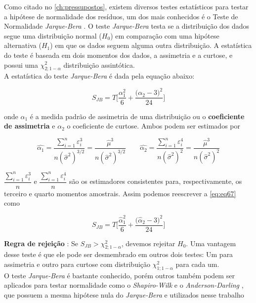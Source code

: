 \noindent Como citado no \autoref{ch:pressupostos}, existem diversos testes estatísticos para testar a hipótese de normalidade dos resíduos, um dos mais conhecidos é o Teste de Normalidade \textit{Jarque-Bera} \cite{jarque1987test}. O teste \textit{Jarque-Bera} testa se a distribuição dos dados segue uma distribuição normal ($H_{0}$) em comparação com uma hipótese alternativa ($H_{1}$) em que os dados seguem alguma outra distribuição. A estatística do teste é baseada em dois momentos dos dados, a assimetria e a curtose, e possui uma $\chi^{2}_{2;1-\alpha}$ distribuição assintótica.\\

\noindent A estatística do teste \textit{Jarque-Bera} é dada pela equação abaixo:

\begin{equation}
    \label{eq:eq67}
    S_{JB} = T\bigg[\frac{\alpha_{1}^{2}}{6} + \frac{\big(\alpha_{2} - 3\big)^{2}}{24} \bigg]
\end{equation}

\noindent onde $\alpha_{1}$ é a medida padrão de assimetria de uma distribuição ou o \textbf{coeficiente de assimetria} e $\alpha_{2}$ o coeficiente de curtose. Ambos podem ser estimados por

$$ \hat{\alpha_1} = \dfrac{\sum_{i=1}^n \varepsilon_i^3}{n(\hat{\sigma}^2)^{3/2}} = \dfrac{\hat{\mu}^3}{n(\hat{\sigma}^2)^{3/2}} \qquad \hat{\alpha_2} = \dfrac{\sum_{i=1}^n \varepsilon_i^4}{n(\hat{\sigma}^2)^2} = \dfrac{\hat{\mu}^3}{n(\hat{\sigma}^2)^2}
$$

\noindent $\dfrac{\sum_{i=1}^n \varepsilon_i^3}{n}$ e $\dfrac{\sum_{i=1}^n \varepsilon_i^4}{n}$ são os estimadores consistentes para, respectivamente, os terceiro e quarto momentos amostrais. Assim podemos reescrever a \autoref{eq:eq67} como

\begin{equation}
    \label{eq:eq68}
    S_{JB} = T\bigg[\frac{\hat{\alpha}_{1}^{2}}{6} + \frac{\big(\hat{\alpha}_{2} - 3\big)^{2}}{24} \bigg]
\end{equation}

\noindent \textbf{Regra de rejeição} : Se $S_{JB} > \chi^{2}_{2;1-\alpha}$, devemos rejeitar $H_{0}$. Uma vantagem desse teste é que ele pode ser desmembrado em outros dois testes: Um para assimetria e outro para curtose com distribuição $\chi^{2}_{1;1-\alpha}$ para cada um.\\

O teste \textit{Jarque-Bera} é bastante conhecido, porém outros também podem ser aplicados para testar normalidade como o \textit{Shapiro-Wilk} \cite{shapiro1965analysis} e o \textit{Anderson-Darling} \cite{anderson1954test}, que possuem a mesma hipótese nula do \textit{Jarque-Bera} e utilizados nesse trabalho


